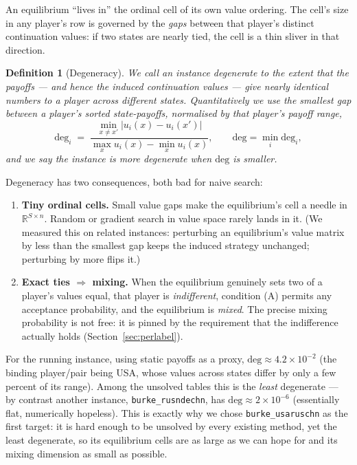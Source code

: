 \documentclass[11pt]{article}
\newcommand{\R}{\mathbb{R}}
\newtheorem{definition}{Definition}
\begin{document}
An equilibrium ``lives in'' the ordinal cell of its own value ordering. The cell's
size in any player's row is governed by the \emph{gaps} between that player's distinct
continuation values: if two states are nearly tied, the cell is a thin sliver in that
direction.

\begin{definition}[Degeneracy]
\label{def:degeneracy}
We call an instance \emph{degenerate} to the extent that the payoffs --- and hence the
induced continuation values --- give nearly identical numbers to a player across
different states. Quantitatively we use the smallest gap between a player's sorted
state-payoffs, normalised by that player's payoff range,
\[
\mathrm{deg}_i \;=\; \frac{\min_{x\neq x'} |u_i(x)-u_i(x')|}{\max_x u_i(x)-\min_x u_i(x)},
\qquad
\mathrm{deg} = \min_i \mathrm{deg}_i ,
\]
and we say the instance is \emph{more degenerate} when $\mathrm{deg}$ is smaller.
\end{definition}

Degeneracy has two consequences, both bad for naive search:
\begin{enumerate}[nosep]
\item \textbf{Tiny ordinal cells.} Small value gaps make the equilibrium's cell a
needle in $\R^{S\times n}$. Random or gradient search in value space rarely lands in
it. (We measured this on related instances: perturbing an equilibrium's value matrix
by less than the smallest gap keeps the induced strategy unchanged; perturbing by
more flips it.)
\item \textbf{Exact ties $\Rightarrow$ mixing.} When the equilibrium genuinely sets
two of a player's values equal, that player is \emph{indifferent}, condition (A)
permits any acceptance probability, and the equilibrium is \emph{mixed}. The precise
mixing probability is not free: it is pinned by the requirement that the indifference
actually holds (Section~\ref{sec:perlabel}).
\end{enumerate}

For the running instance, using static payoffs as a proxy, $\mathrm{deg}\approx
4.2\times10^{-2}$ (the binding player/pair being USA, whose values across states
differ by only a few percent of its range). Among the unsolved tables this is the
\emph{least} degenerate --- by contrast another instance,
\texttt{burke\_rusndechn}, has $\mathrm{deg}\approx 2\times10^{-6}$ (essentially flat,
numerically hopeless). This is exactly why we chose \texttt{burke\_usaruschn} as the
first target: it is hard enough to be unsolved by every existing method, yet the
least degenerate, so its equilibrium cells are as large as we can hope for and its
mixing dimension as small as possible.
\end{document}
